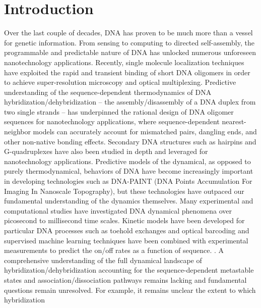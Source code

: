 \documentclass[journal=jpcbfk,manuscript=article]{achemso}
\begin{document}

\newpage

\section{\label{sec:intro}Introduction}

Over the last couple of decades, DNA has proven to be much more than a vessel for genetic information. From sensing to computing to directed self-assembly, the programmable and predictable nature of DNA has unlocked numerous unforeseen nanotechnology applications.\citep{Seeman2017DNANanotechnology, Adleman1994MolecularProblems, Rothemund2006FoldingPatterns, Gu2010ALine} Recently, single molecule localization techniques have exploited the rapid and transient binding of short DNA oligomers in order to achieve super-resolution microscopy and optical multiplexing. \cite{Schnitzbauer2017Super-resolutionDNA-PAINT, Shah2019, Strauss2020UpDNA-PAINT} Predictive understanding of the sequence-dependent thermodynamics of DNA hybridization/dehybridization -- the assembly/disassembly of a DNA duplex from two single strands -- has underpinned the rational design of DNA oligomer sequences for nanotechnology applications, where sequence-dependent nearest-neighbor models can accurately account for mismatched pairs, dangling ends, and other non-native bonding effects.\citep{SantaLucia1998AThermodynamics, Santalucia2004TheMotifs} Secondary DNA structures such as hairpins and G-quadruplexes have also been studied in depth and leveraged for nanotechnology applications.\citep{Tsukanov2013DetailedOrigami, Mosayebi2014TheFormation, Mergny2019DNANanotechnology} Predictive models of the dynamical, as opposed to purely thermodynamical, behaviors of DNA have become increasingly important in developing technologies such as DNA-PAINT (DNA Points Accumulation For Imaging In Nanoscale Topography), but these technologies have outpaced our fundamental understanding of the dynamics themselves. \citep{Deluca2020DynamicDevices, Cordes2010SensingTransfer, Naimark2020DNADevelopment} Many experimental and computational studies have investigated DNA dynamical phenomena over picosecond to millisecond time scales.\citep{Yin2011KineticsHybridization, Xiao2019, Hinckley2014Coarse-grainedEffects, Sanstead2016, Porschke1971CooperativeTransition} Kinetic models have been developed for particular DNA processes such as toehold exchanges and optical barcoding \citep{Zhang2009ControlExchange, Shah2019ProgrammingFingerprinting} and supervised machine learning techniques have been combined with experimental measurements to predict the on/off rates as a function of sequence. \citep{Schickinger2018TetheredHelices, Zhang2018PredictingSequence, Shah2019}. A comprehensive understanding of the full dynamical landscape of hybridization/dehybridization accounting for the sequence-dependent metastable states and association/dissociation pathways remains lacking and fundamental questions remain unresolved. For example, it remains unclear the extent to which hybridization 
\end{document}
